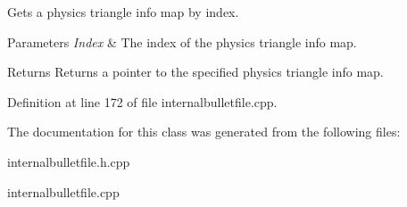 Gets a physics triangle info map by index. 


\begin{DoxyParams}{Parameters}
{\em Index} & The index of the physics triangle info map. \\
\hline
\end{DoxyParams}
\begin{DoxyReturn}{Returns}
Returns a pointer to the specified physics triangle info map. 
\end{DoxyReturn}


Definition at line 172 of file internalbulletfile.cpp.



The documentation for this class was generated from the following files:\begin{DoxyCompactItemize}
\item 
internalbulletfile.h.cpp\item 
internalbulletfile.cpp\end{DoxyCompactItemize}
